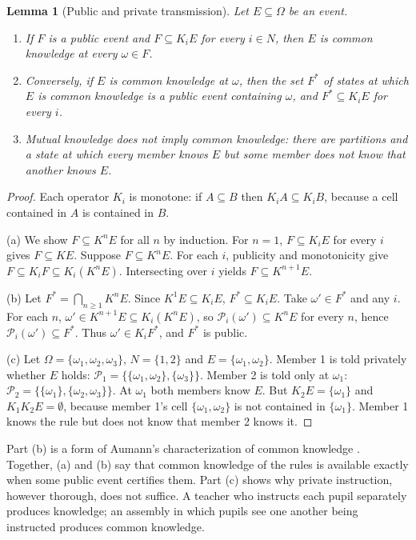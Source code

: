 \documentclass[11pt,letterpaper]{article}
\newtheorem{lemma}[theorem]{Lemma}
\theoremstyle{definition}
\theoremstyle{remark}
\begin{document}
\begin{lemma}[Public and private transmission]
\label{lem:ideological-power:public-signal}
Let $E\subseteq\Omega$ be an event.
\begin{enumerate}
\item[(a)] If $F$ is a public event and $F\subseteq K_iE$ for every $i\in N$, then $E$ is common knowledge at every $\omega\in F$.
\item[(b)] Conversely, if $E$ is common knowledge at $\omega$, then the set $F^\ast$ of states at which $E$ is common knowledge is a public event containing $\omega$, and $F^\ast\subseteq K_iE$ for every $i$.
\item[(c)] Mutual knowledge does not imply common knowledge: there are partitions and a state at which every member knows $E$ but some member does not know that another knows $E$.
\end{enumerate}
\end{lemma}

\begin{proof}
Each operator $K_i$ is monotone: if $A\subseteq B$ then $K_iA\subseteq K_iB$, because a cell contained in $A$ is contained in $B$.

(a) We show $F\subseteq K^nE$ for all $n$ by induction. For $n=1$, $F\subseteq K_iE$ for every $i$ gives $F\subseteq KE$. Suppose $F\subseteq K^nE$. For each $i$, publicity and monotonicity give $F\subseteq K_iF\subseteq K_i(K^nE)$. Intersecting over $i$ yields $F\subseteq K^{n+1}E$.

(b) Let $F^\ast=\bigcap_{n\geq1}K^nE$. Since $K^1E\subseteq K_iE$, $F^\ast\subseteq K_iE$. Take $\omega'\in F^\ast$ and any $i$. For each $n$, $\omega'\in K^{n+1}E\subseteq K_i(K^nE)$, so $\mathcal{P}_i(\omega')\subseteq K^nE$ for every $n$, hence $\mathcal{P}_i(\omega')\subseteq F^\ast$. Thus $\omega'\in K_iF^\ast$, and $F^\ast$ is public.

(c) Let $\Omega=\{\omega_1,\omega_2,\omega_3\}$, $N=\{1,2\}$ and $E=\{\omega_1,\omega_2\}$. Member 1 is told privately whether $E$ holds: $\mathcal{P}_1=\{\{\omega_1,\omega_2\},\{\omega_3\}\}$. Member 2 is told only at $\omega_1$: $\mathcal{P}_2=\{\{\omega_1\},\{\omega_2,\omega_3\}\}$. At $\omega_1$ both members know $E$. But $K_2E=\{\omega_1\}$ and $K_1K_2E=\emptyset$, because member 1's cell $\{\omega_1,\omega_2\}$ is not contained in $\{\omega_1\}$. Member 1 knows the rule but does not know that member 2 knows it.
\end{proof}

Part (b) is a form of Aumann's characterization of common knowledge \citep{aumann1976}. Together, (a) and (b) say that common knowledge of the rules is available exactly when some public event certifies them. Part (c) shows why private instruction, however thorough, does not suffice. A teacher who instructs each pupil separately produces knowledge; an assembly in which pupils see one another being instructed produces common knowledge.
\end{document}
